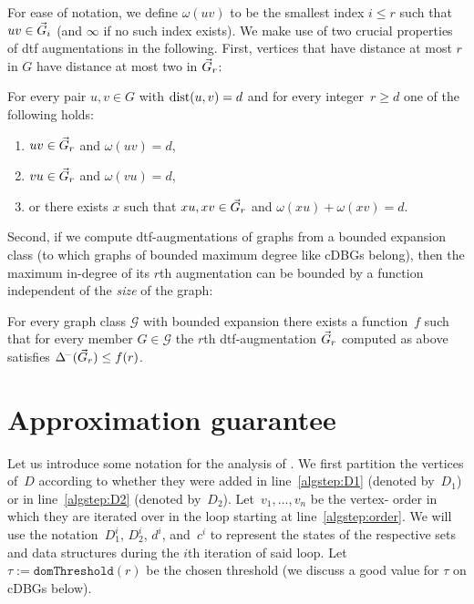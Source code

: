 For ease of notation, we define $\omega(uv)$ to be the
smallest index $i \leq r$ such that $uv \in \vec{G}_i$
(and $\infty$ if no such index exists).
We make use of two crucial properties of dtf augmentations
in the following. First, vertices that have distance at most
$r$ in $G$ have distance at most two in $\vec{G}_r$:

\begin{lemma}
  For every pair $u,v \in G$ with $\text{dist}(u,v) = d$ and
  for every integer~$r \geq d$ one of the following holds:
  \begin{enumerate}
    \item $uv \in \vec{G}_r$ and $\omega(uv) = d$,
    \item $vu \in \vec{G}_r$ and $\omega(vu) = d$,
    \item or there exists $x$ such that $xu, xv \in \vec{G}_r$ and
          $\omega(xu) + \omega(xv) = d$.
  \end{enumerate}
\end{lemma}

\noindent
Second, if we compute dtf-augmentations of graphs from a bounded
expansion class (to which graphs of bounded maximum degree like
cDBGs belong), then the maximum in-degree
of its $r$th augmentation can be bounded by a function independent
of the \emph{size} of the graph:

\begin{theorem}\label{thm:dtf}
  For every graph class $\mathcal G$ with bounded expansion there exists
  a function~$f$ such that for every member $G \in \mathcal G$
  the $r$th dtf-augmentation $\vec{G}_r$ computed as above
  satisfies
  $\Delta^{\!-}(\vec{G}_r) \leq f(r)$.
\end{theorem}

\section{Approximation guarantee}\label{app:threshold}

Let us introduce some notation for the analysis of
. We first partition the vertices of~$D$ according
to whether they were added in line~\ref{algstep:D1} (denoted by~$D_1$) or in
line~\ref{algstep:D2} (denoted by~$D_2$). Let~$v_1,\ldots,v_n$ be the vertex-
order in which they are iterated over in the loop starting at
line~\ref{algstep:order}. We will use the notation~$D_1^i$, $D_2^i$, $d^i$,
and~$c^i$ to represent the states of the respective sets and data structures
during the $i$th iteration of said loop. Let~$\tau :=
\texttt{domThreshold}(r)$ be the chosen threshold (we discuss a good value
for $\tau$ on cDBGs below).

